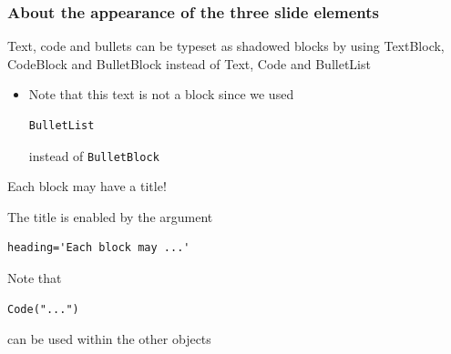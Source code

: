 \documentclass{beamer}
\begin{document}
\begin{frame}[fragile]
\frametitle{About the appearance of the three slide elements}

\begin{block}

Text, code and bullets can be typeset as shadowed blocks by using TextBlock, CodeBlock and BulletBlock instead of Text, Code and BulletList

\end{block}
\begin{itemize}
\item Note that this text is not a block since we used\begin{Verbatim}[fontsize=\footnotesize,tabsize=4,baselinestretch=0.85,fontfamily=tt,xleftmargin=7mm]
BulletList
\end{Verbatim}
instead of \texttt{BulletBlock}
\end{itemize}
\begin{block}{Each block may have a title!}

The title is enabled by the argument\begin{Verbatim}[fontsize=\footnotesize,tabsize=4,baselinestretch=0.85,fontfamily=tt,xleftmargin=7mm]
heading='Each block may ...'
\end{Verbatim}


\end{block}
\begin{block}

Note that \begin{Verbatim}[fontsize=\footnotesize,tabsize=4,baselinestretch=0.85,fontfamily=tt,xleftmargin=7mm]
Code("...")
\end{Verbatim}
can be used within the other objects

\end{block}

\end{frame}
\end{document}
